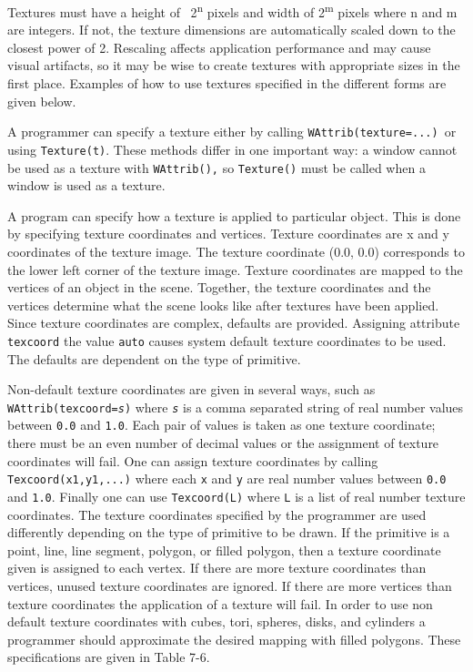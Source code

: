Textures must have a height of \ 2\textsuperscript{n} pixels and width
of 2\textsuperscript{m} pixels where n and m are integers. If not, the
texture dimensions are automatically scaled down to the closest power
of 2. Rescaling affects application performance and may cause visual
artifacts, so it may be wise to create textures with appropriate sizes
in the first place. Examples of how to use textures specified in the
different forms are given below.

A programmer can specify a texture either by calling
\texttt{WAttrib({\textquotedbl}texture=...{\textquotedbl})}\texttt{ }or
using \texttt{Texture(t)}. These methods differ in one important way: a
window cannot be used as a texture with \texttt{WAttrib(),} so
\texttt{Texture()} must be called when a window is used as a texture.

A program can specify how a texture is applied to particular object.
This is done by specifying texture coordinates and vertices. Texture
coordinates are x and y coordinates of the texture image. The texture
coordinate (0.0, 0.0) corresponds to the lower left corner of the
texture image. Texture coordinates are mapped to the vertices of an
object in the scene. Together, the texture coordinates and the vertices
determine what the scene looks like after textures have been applied.
Since texture coordinates are complex, defaults are provided. Assigning
attribute \texttt{texcoord} the value \texttt{auto} causes system
default texture coordinates to be used. The defaults are dependent on
the type of primitive.

Non-default texture coordinates are given in several ways, such as \linebreak
\texttt{WAttrib({\textquotedbl}texcoord=}\texttt{\textit{s{\textquotedbl}}}\texttt{)}
where \texttt{\textit{s}} is a comma separated string of real number
values between \texttt{0.0} and \texttt{1.0}. Each pair of values is
taken as one texture coordinate; there must be an even number of
decimal values or the assignment of texture coordinates will fail. One
can assign texture coordinates by calling \texttt{Texcoord(x1,y1,...)}
where each \texttt{x} and \texttt{y} are real number values between
\texttt{0.0} and \texttt{1.0}. Finally one can use \texttt{Texcoord(L)}
where \texttt{L} is a list of real number texture coordinates. The
texture coordinates specified by the programmer are used differently
depending on the type of primitive to be drawn. If the primitive is a
point, line, line segment, polygon, or filled polygon, then a texture
coordinate given is assigned to each vertex. If there are more texture
coordinates than vertices, unused texture coordinates are ignored. If
there are more vertices than texture coordinates the application of a
texture will fail. In order to use non default texture coordinates
with cubes, tori, spheres, disks, and cylinders a programmer should
approximate the desired mapping with filled polygons. These
specifications are given in Table 7-6.

